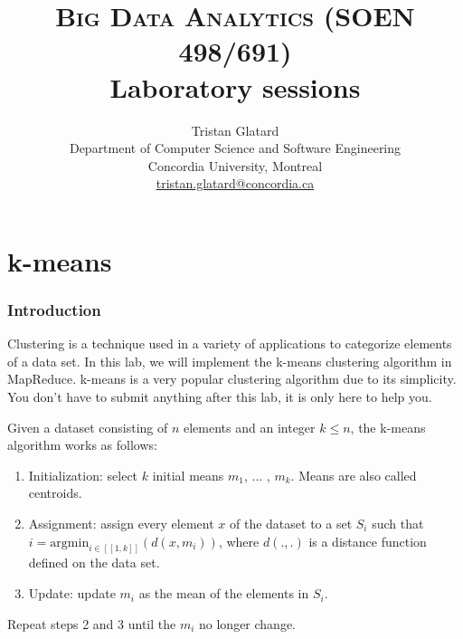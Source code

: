 \documentclass[11pt]{article}
\title{\textsc{Big Data Analytics (SOEN 498/691)} \\ Laboratory sessions}
\author{Tristan Glatard\\Department of Computer Science and Software Engineering\\Concordia University, Montreal\\\href{mailto:tristan.glatard@concordia.ca}{tristan.glatard@concordia.ca}}
\begin{document}
\maketitle

\newpage

\tableofcontents

\newpage

\part{k-means}

\section{Introduction}

Clustering is a technique used in a variety of applications to
categorize elements of a data set. In this lab, we will implement the
k-means clustering algorithm in MapReduce. k-means is a very popular
clustering algorithm due to its simplicity. You don't have to submit
anything after this lab, it is only here to help you.

Given a dataset consisting of $n$ elements and an integer $k\leq n$, the k-means algorithm works as follows:
\begin{enumerate}
\item Initialization: select $k$ initial means $m_1$, ... , $m_k$. Means are also called centroids.
\item Assignment: assign every element $x$ of the dataset to a set
  $S_i$ such that $i=\mathrm{argmin}_{i \in [\![1,k]\!]}(d(x,m_i))$,
  where $d(.,.)$ is a distance function defined on the data set.
\item Update: update $m_i$ as the mean of the elements in $S_i$.
\end{enumerate}
Repeat steps 2 and 3 until the $m_i$ no longer change.
\end{document}
